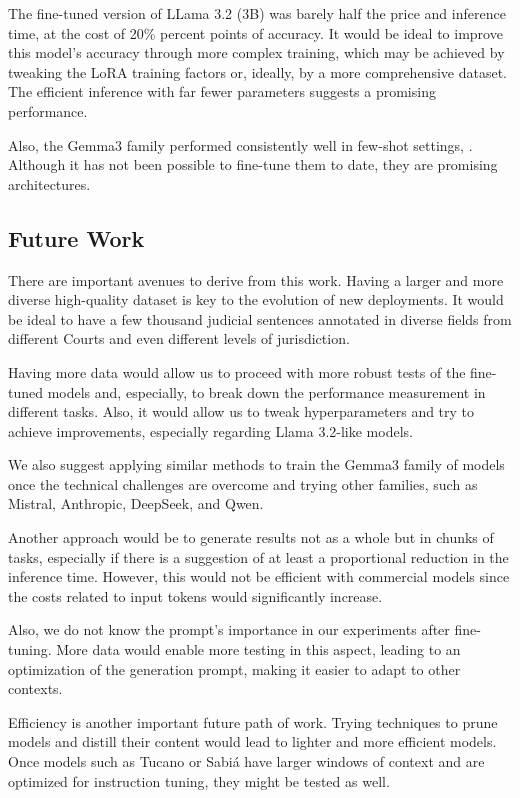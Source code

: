 \documentclass[
  12pt,
]{article}
\begin{document}
The fine-tuned version of LLama 3.2 (3B) was barely half the price and
inference time, at the cost of 20\% percent points of accuracy. It would
be ideal to improve this model's accuracy through more complex training,
which may be achieved by tweaking the LoRA training factors or, ideally,
by a more comprehensive dataset. The efficient inference with far fewer
parameters suggests a promising performance.

Also, the Gemma3 family performed consistently well in few-shot
settings, . Although it has not been possible to fine-tune them to date,
they are promising architectures.

\subsection{Future Work}\label{sec-future-research}

There are important avenues to derive from this work. Having a larger
and more diverse high-quality dataset is key to the evolution of new
deployments. It would be ideal to have a few thousand judicial sentences
annotated in diverse fields from different Courts and even different
levels of jurisdiction.

Having more data would allow us to proceed with more robust tests of the
fine-tuned models and, especially, to break down the performance
measurement in different tasks. Also, it would allow us to tweak
hyperparameters and try to achieve improvements, especially regarding
Llama 3.2-like models.

We also suggest applying similar methods to train the Gemma3 family of
models once the technical challenges are overcome and trying other
families, such as Mistral, Anthropic, DeepSeek, and Qwen.

Another approach would be to generate results not as a whole but in
chunks of tasks, especially if there is a suggestion of at least a
proportional reduction in the inference time. However, this would not be
efficient with commercial models since the costs related to input tokens
would significantly increase.

Also, we do not know the prompt's importance in our experiments after
fine-tuning. More data would enable more testing in this aspect, leading
to an optimization of the generation prompt, making it easier to adapt
to other contexts.

Efficiency is another important future path of work. Trying techniques
to prune models and distill their content would lead to lighter and more
efficient models. Once models such as Tucano or Sabiá have larger
windows of context and are optimized for instruction tuning, they might
be tested as well.
\end{document}
